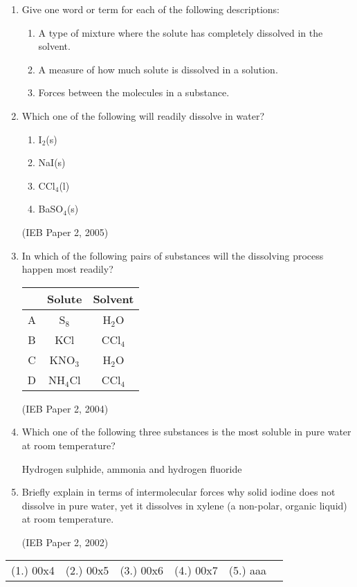 \begin{eocexercises}{}

\begin{enumerate}
\item{Give one word or term for each of the following descriptions:}
\begin{enumerate}
\item{A type of mixture where the solute has completely dissolved in the solvent.}
\item{A measure of how much solute is dissolved in a solution.}
\item{Forces between the molecules in a substance.}
\end{enumerate}

\item{Which one of the following will readily dissolve in water?}
\begin{enumerate}
\item{I$_{2}$(s)}
\item{NaI(s)}
\item{CCl$_{4}$(l)}
\item{BaSO$_{4}$(s)}
\end{enumerate}

(IEB Paper 2, 2005)

\item{In which of the following pairs of substances will the dissolving process happen most readily?}

\begin{tabular}{|c|c|c|}\hline
& \textbf{Solute} & \textbf{Solvent} \\\hline
A & S$_{8}$ & H$_{2}$O \\\hline
B & KCl & CCl$_{4}$ \\\hline
C & KNO$_{3}$ & H$_{2}$O \\\hline
D & NH$_{4}$Cl & CCl$_{4}$ \\\hline
\end{tabular}

(IEB Paper 2, 2004)


\item{Which one of the following three substances is the most soluble in pure water at room temperature?}
\begin{center}
Hydrogen sulphide, ammonia and hydrogen fluoride
\end{center}

\item{Briefly explain in terms of intermolecular forces why solid iodine does not dissolve in pure water, yet it dissolves in xylene (a non-polar, organic liquid) at room temperature.}

(IEB Paper 2, 2002)

\end{enumerate}

\practiceinfo

\begin{tabular}[h]{cccccc}
(1.) 00x4 & (2.) 00x5 & (3.) 00x6 & (4.) 00x7 & (5.) aaa
 \end{tabular}
\end{eocexercises}







